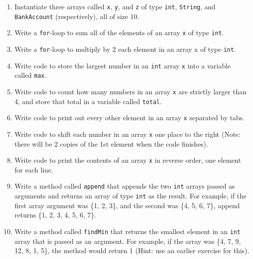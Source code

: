 \setcounter{counter}{1}
\begin{enumerate}[label={\arabic{counter}\addtocounter{counter}{1}}.]

\item Instantiate three arrays called \verb|x|, \verb|y|, and \verb|z| of type \verb|int|, \verb|String|, and \verb|BankAccount| (respectively), all of size 10.

\item Write a \verb|for|-loop to sum all of the elements of an array \verb|x| of type \verb|int|.

\item Write a \verb|for|-loop to multiply by 2 each element in an array x of type \verb|int|.

\item Write code to store the largest number in an \verb|int| array \verb|x| into a variable called \verb|max|.

\item Write code to count how many numbers in an array \verb|x| are strictly larger than 4, and store that total in a variable called \verb|total|.

\item Write code to print out every other element in an array \verb|x| separated by tabs.

\item Write code to shift each number in an array \verb|x| one place to the right (Note: there will be 2 copies of the 1st element when the code finishes).

\item Write code to print the contents of an array \verb|x| in reverse order, one element for each line.

\item Write a method called \verb|append| that appends the two \verb|int| arrays passed as arguments and returns an array of type \verb|int| as the result. For example, if the first array argument was \{1, 2, 3\}, and the second was \{4, 5, 6, 7\}, append returns \{1, 2, 3, 4, 5, 6, 7\}.

\item Write a method called \verb|findMin| that returns the smallest element in an \verb|int| array that is passed as an argument. For example, if the array was \{4, 7, 9, 12, 8, 1, 5\}, the method would return 1 (Hint: use an earlier exercise for this).

\end{enumerate}